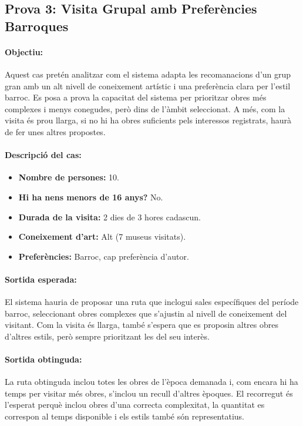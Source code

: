 \documentclass[a4paper]{article}
\begin{document}
	
	\subsection{Prova 3: Visita Grupal amb Preferències Barroques}
	
	\paragraph{Objectiu:} 
	Aquest cas pretén analitzar com el sistema adapta les recomanacions d'un grup gran amb un alt nivell de coneixement artístic i una preferència clara per l’estil barroc. Es posa a prova la capacitat del sistema per prioritzar obres més complexes i menys conegudes, però dins de l’àmbit seleccionat. A més, com la visita és prou llarga, si no hi ha obres suficients pels interessos registrats, haurà de fer unes altres propostes.
	
	\paragraph{Descripció del cas:} 
	
	\begin{itemize}
		\item \textbf{Nombre de persones:} 10.
		\item \textbf{Hi ha nens menors de 16 anys?} No.
		\item \textbf{Durada de la visita:} 2 dies de 3 hores cadascun.
		\item \textbf{Coneixement d’art:} Alt (7 museus visitats).
		\item \textbf{Preferències:} Barroc, cap preferència d'autor.
	\end{itemize}
	
	\paragraph{Sortida esperada:}
	El sistema hauria de proposar una ruta que inclogui sales específiques del període barroc, seleccionant obres complexes que s’ajustin al nivell de coneixement del visitant. Com la visita és llarga, també s'espera que es proposin altres obres d'altres estils, però sempre prioritzant les del seu interès.
	
	\paragraph{Sortida obtinguda:}
	La ruta obtinguda inclou totes les obres de l'època demanada i, com encara hi ha temps per visitar més obres, s'inclou un recull d'altres èpoques. El recorregut és l'esperat perquè inclou obres d'una correcta complexitat, la quantitat es correspon al temps disponible i els estils també són representatius. 
	
\end{document}
